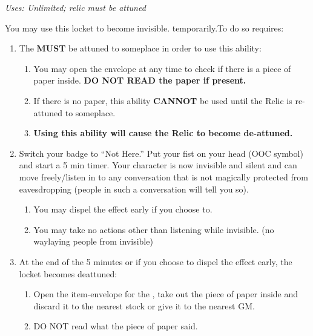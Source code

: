\documentclass[green]{GL2020}
\begin{document}
\name{\gInvisible{}}

\emph{Uses: Unlimited; relic must be attuned} 

You may use this locket to become invisible. temporarily.To do so requires:

\begin{enumerate}
	\item The \iLocket{} \textbf{MUST} be attuned to someplace in order to use this ability:
	\begin{enumerate}
		\item You may open the envelope at any time to check if there is a piece of paper inside. \textbf{DO NOT READ the paper if present.}
		\item  If there is no paper, this ability \textbf{CANNOT} be used until the Relic is re-attuned to someplace.
		\item \textbf{Using this ability will cause the Relic to become de-attuned.}
	\end{enumerate}
	\item Switch your badge to ``Not Here.'' Put your fist on your head (OOC symbol) and start a 5 min timer. Your character is now invisible and silent and can move freely/listen in to any conversation that is not magically protected from eavesdropping (people in such a conversation will tell you so).
	\begin{enumerate}
		\item You may dispel the effect early if you choose to.
		\item You may take no actions other than listening while invisible. (no waylaying people from invisible)
	\end{enumerate}
	\item At the end of the 5 minutes or if you choose to dispel the effect early, the locket becomes deattuned:
	\begin{enumerate}
		\item Open the item-envelope for the \iLocket{}, take out the piece of paper inside and discard it to the nearest stock or give it to the nearest GM.
		\item DO NOT read what the piece of paper said.
	\end{enumerate}
\end{enumerate}
\end{document}

